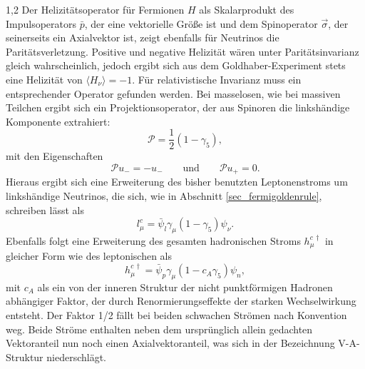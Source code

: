 \documentclass[11pt,a4paper,twoside]{report}
\begin{document}
\begin{spacing}{1,2}
\noindent
Der Helizitätsoperator für Fermionen $H$ als Skalarprodukt des Impulsoperators $\bar p$, der eine vektorielle Größe ist und dem Spinoperator $\vec \sigma$, 
der seinerseits ein Axialvektor ist, zeigt ebenfalls für Neutrinos die Paritätsverletzung. Positive und negative Helizität wären unter
Paritätsinvarianz gleich wahrscheinlich, jedoch ergibt sich aus dem Goldhaber-Experiment stets eine Helizität von $\langle H_\nu \rangle= -1$. Für relativistische
Invarianz muss ein entsprechender Operator gefunden werden. Bei masselosen, wie bei massiven Teilchen ergibt sich ein Projektionsoperator, der aus Spinoren 
die linkshändige Komponente extrahiert:
\begin{equation}
 \mathcal{P} = \frac12(1-\gamma_5),
\end{equation}
mit den Eigenschaften
\begin{equation}
 \mathcal{P}u_- = -u_- \qquad \text{und}\qquad \mathcal{P}u_+ = 0.
\end{equation}
Hieraus ergibt sich eine Erweiterung des bisher benutzten Leptonenstroms um linkshändige Neutrinos, die sich, wie in Abschnitt \ref{sec_fermigoldenrule}, schreiben lässt als
\begin{equation}
 l_\mu^c = \bar \psi_l \gamma_\mu (1-\gamma_5) \psi_\nu.
\end{equation}
Ebenfalls folgt eine Erweiterung des gesamten hadronischen Stroms $h_\mu^{c\,\dagger}$ in gleicher Form wie des leptonischen als
\begin{equation}
 h_\mu^{c\,\dagger} = \bar \psi_p \gamma_\mu(1-c_A\gamma_5)\psi_n,
\end{equation}
mit $c_A$ als ein von der inneren Struktur der nicht punktförmigen Hadronen abhängiger Faktor, der durch Renormierungseffekte der starken Wechselwirkung entsteht.
Der Faktor 1/2 fällt bei beiden schwachen Strömen nach Konvention weg. 
Beide Ströme enthalten neben dem ursprünglich allein gedachten Vektoranteil nun noch einen Axialvektoranteil, was sich in der Bezeichnung V-A-Struktur
niederschlägt.


\end{spacing}
\end{document}
